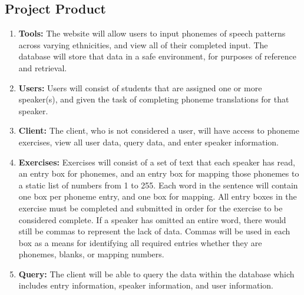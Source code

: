 \documentclass[12pt, a4paper, oneside]{article}
\begin{document}
\subsection*{Project Product}
\begin{enumerate}
\item \textbf{Tools:} The website will allow users to input phonemes of speech patterns across varying ethnicities, and view all of their completed input. The database will store that data in a safe environment, for purposes of reference and retrieval. 
 
\item \textbf{Users:} Users will consist of students that are assigned one or more speaker(s), and given the task of completing phoneme translations for that speaker.

\item \textbf{Client:} The client, who is not considered a user, will have access to phoneme exercises, view all user data, query data, and enter speaker information. 

\item \textbf{Exercises:} Exercises will consist of a set of text that each speaker has read, an entry box for phonemes, and an entry box for mapping those phonemes to a static list of numbers from 1 to 255. Each word in the sentence will contain one box per phoneme entry, and one box for mapping. All entry boxes in the exercise must be completed and submitted in order for the exercise to be considered complete. If a speaker has omitted an entire word, there would still be commas to represent the lack of data. Commas will be used in each box as a means for identifying all required entries whether they are phonemes, blanks, or mapping numbers.

\item \textbf{Query:} The client will be able to query the data within the database which includes entry information, speaker information, and user information.
\end{enumerate}
\end{document}
